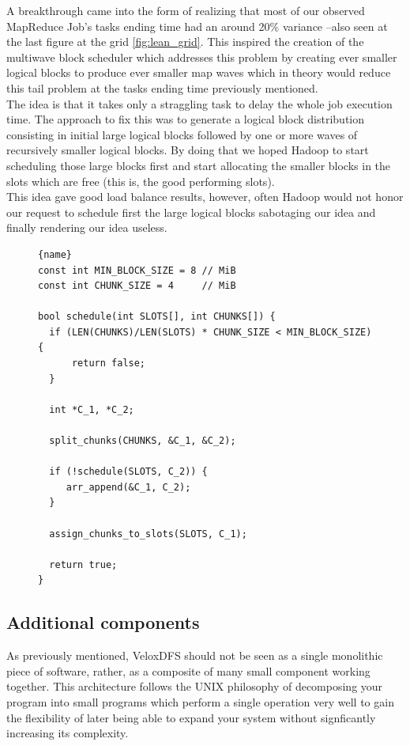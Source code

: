 A breakthrough came into the form of realizing that most of our observed MapReduce Job's tasks ending time had an around 20\% variance --also seen at the last figure at the grid \ref{fig:lean_grid}. This inspired the creation of the multiwave block scheduler which addresses this problem by creating ever smaller logical blocks to produce ever smaller map waves which in theory would reduce this tail problem at the tasks ending time previously mentioned. \\

The idea is that it takes only a straggling task to delay the whole job execution time. The approach to fix this was to generate a logical block distribution consisting in initial large logical blocks followed by one or more waves of recursively smaller logical blocks. By doing that we hoped Hadoop to start scheduling those large blocks first and start allocating the smaller blocks in the slots which are free (this is, the good performing slots). \\
This idea gave good load balance results, however, often Hadoop would not honor our request to schedule first the large logical blocks sabotaging our idea and finally rendering our idea useless.

\begin{figure}
\begin{lstlisting}[caption=Recursivily generate waves, label={lst:recursive}, frame=tb]{name}
const int MIN_BLOCK_SIZE = 8 // MiB
const int CHUNK_SIZE = 4     // MiB

bool schedule(int SLOTS[], int CHUNKS[]) {
  if (LEN(CHUNKS)/LEN(SLOTS) * CHUNK_SIZE < MIN_BLOCK_SIZE) {
      return false;
  }

  int *C_1, *C_2;

  split_chunks(CHUNKS, &C_1, &C_2);

  if (!schedule(SLOTS, C_2)) {
     arr_append(&C_1, C_2);
  }

  assign_chunks_to_slots(SLOTS, C_1);

  return true;
}
\end{lstlisting}
\end{figure}

\subsection{Additional components}
As previously mentioned, VeloxDFS should not be seen as a single monolithic piece of software, rather, as a composite
of many small component working together. This architecture follows the UNIX philosophy of decomposing your program into
small programs which perform a single operation very well to gain the flexibility of later being able to expand your system
without signficantly increasing its complexity. \\ 

